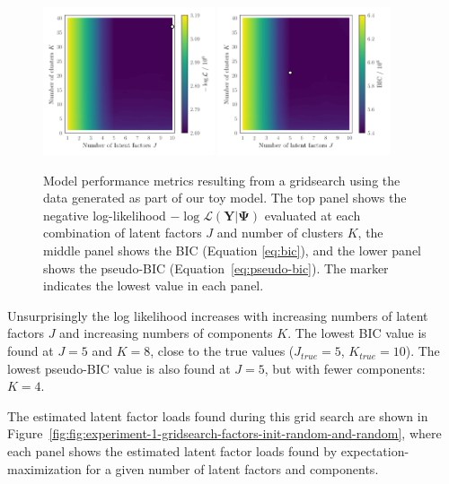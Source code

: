 \documentclass[twocolumn]{aastex61}
\newcommand{\vect}[1]{\boldsymbol{\mathbf{#1}}}
\renewcommand{\vec}[1]{\vect{#1}}
\newcommand{\data}{\textbf{Y}}
\newcommand{\NumLatentFactors}{J}
\newcommand{\NumComponents}{K}
\begin{document}
\begin{figure}
	\includegraphics[width=0.45\textwidth]{experiments/exp1-gridsearch-ll-contours.png}
	\includegraphics[width=0.45\textwidth]{experiments/exp1-gridsearch-bic-contours.png}
    \caption{Model performance metrics resulting from a gridsearch using the
    		 data generated as part of our toy model. The top 
		 	 panel shows the negative log-likelihood 
			 $-\log{\mathcal{L}\left(\data|\vec\Psi\right)}$ 
			 evaluated at each combination of latent factors $J$ and number 
			 of clusters $K$, the middle panel shows the BIC (Equation \ref{eq:bic}), 
			 and the lower panel shows
			 the pseudo-BIC
			 (Equation~\ref{eq:pseudo-bic}). The marker indicates the 
			 lowest value in each panel.}
    \label{fig:experiment-1-gridsearch}
\end{figure}




Unsurprisingly the log likelihood increases with increasing numbers of latent
factors $\NumLatentFactors$ and increasing numbers of components $\NumComponents$.
The lowest BIC value is found at $\NumLatentFactors = 5$
and $\NumComponents = 8$, close to the true values ($\NumLatentFactors_{true} = 5$,
$\NumComponents_{true} = 10$). The lowest pseudo-BIC value is also found at
$\NumLatentFactors = 5$, but with fewer components: $\NumComponents = 4$.

The estimated latent factor loads found during this grid search are shown in
Figure~\ref{fig:fig:experiment-1-gridsearch-factors-init-random-and-random},
where each panel shows the estimated latent factor loads found by
expectation-maximization for a given number of latent factors and components.
\end{document}
